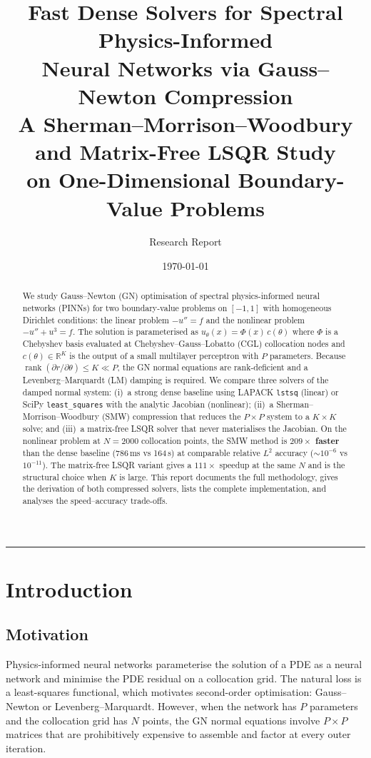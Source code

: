 \documentclass[11pt,a4paper]{article}
\title{
  \vspace{-1.2cm}
  \textbf{Fast Dense Solvers for Spectral Physics-Informed\\
  Neural Networks via Gauss--Newton Compression}\\[3pt]
  \large A Sherman--Morrison--Woodbury and Matrix-Free LSQR Study\\[2pt]
  \large on One-Dimensional Boundary-Value Problems
}
\author{Research Report}
\date{\today}
\newcommand{\R}{\mathbb{R}}
\newcommand{\rank}{\operatorname{rank}}
\begin{document}
\maketitle

\begin{abstract}
We study Gauss--Newton (GN) optimisation of spectral physics-informed neural networks
(PINNs) for two boundary-value problems on $[-1,1]$ with homogeneous Dirichlet
conditions: the linear problem $-u'' = f$ and the nonlinear problem
$-u'' + u^{3} = f$. The solution is parameterised as
$u_{\theta}(x) = \Phi(x)\, c(\theta)$ where $\Phi$ is a Chebyshev basis evaluated at
Chebyshev--Gauss--Lobatto (CGL) collocation nodes and $c(\theta)\in\R^{K}$ is the
output of a small multilayer perceptron with $P$ parameters. Because
$\rank(\partial r/\partial\theta) \le K \ll P$, the GN normal equations are
rank-deficient and a Levenberg--Marquardt (LM) damping is required.
We compare three solvers of the damped normal system: (i)~a strong dense baseline
using LAPACK \texttt{lstsq} (linear) or SciPy \texttt{least\_squares} with the
analytic Jacobian (nonlinear); (ii)~a Sherman--Morrison--Woodbury (SMW) compression
that reduces the $P\times P$ system to a $K\times K$ solve; and (iii)~a matrix-free
LSQR solver that never materialises the Jacobian. On the nonlinear problem at
$N=2000$ collocation points, the SMW method is \textbf{$209\times$ faster} than
the dense baseline (786\,ms vs 164\,s) at comparable relative $L^{2}$ accuracy
($\sim\!10^{-6}$ vs $10^{-11}$). The matrix-free LSQR variant gives a $111\times$
speedup at the same $N$ and is the structural choice when $K$ is large.
This report documents the full methodology, gives the derivation of both compressed
solvers, lists the complete implementation, and analyses the speed--accuracy
trade-offs.
\end{abstract}

\tableofcontents
\bigskip\hrule\bigskip

\section{Introduction}
\label{sec:intro}

\subsection{Motivation}

Physics-informed neural networks parameterise the solution of a PDE as a
neural network and minimise the PDE residual on a collocation grid. The natural
loss is a least-squares functional, which motivates second-order optimisation:
Gauss--Newton or Levenberg--Marquardt. However, when the network has $P$
parameters and the collocation grid has $N$ points, the GN normal equations
involve $P\times P$ matrices that are prohibitively expensive to assemble and
factor at every outer iteration.
\end{document}
